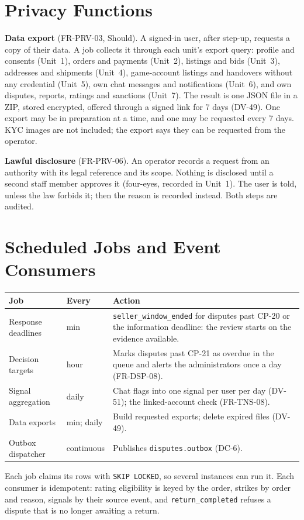\documentclass[11pt,a4paper]{article}
\newenvironment{dtable}[1]{\small\begin{longtable}{#1}}{\end{longtable}}
\begin{document}
\section{Privacy Functions}
\label{sec:privacy}
\textbf{Data export} (FR-PRV-03, Should). A signed-in user, after step-up, requests a copy of their data. A job collects it through each unit's export query: profile and consents (Unit~1), orders and payments (Unit~2), listings and bids (Unit~3), addresses and shipments (Unit~4), game-account listings and handovers without any credential (Unit~5), own chat messages and notifications (Unit~6), and own disputes, reports, ratings and sanctions (Unit~7). The result is one JSON file in a ZIP, stored encrypted, offered through a signed link for 7 days (DV-49). One export may be in preparation at a time, and one may be requested every 7 days. KYC images are not included; the export says they can be requested from the operator.

\textbf{Lawful disclosure} (FR-PRV-06). An operator records a request from an authority with its legal reference and its scope. Nothing is disclosed until a second staff member approves it (four-eyes, recorded in Unit~1). The user is told, unless the law forbids it; then the reason is recorded instead. Both steps are audited.
\section{Scheduled Jobs and Event Consumers}
\label{sec:jobs}
\begin{dtable}{@{}>{\raggedright\arraybackslash}p{3.8cm}>{\raggedright\arraybackslash}p{1.8cm}>{\raggedright\arraybackslash}p{9.6cm}@{}}
\toprule
\textbf{Job} & \textbf{Every} & \textbf{Action} \\ \midrule \endhead
Response deadlines & 5 min & \texttt{seller\_window\_ended} for disputes past CP-20 or the information deadline: the review starts on the evidence available. \\
Decision targets & 1 hour & Marks disputes past CP-21 as overdue in the queue and alerts the administrators once a day (FR-DSP-08). \\
Signal aggregation & daily & Chat flags into one signal per user per day (DV-51); the linked-account check (FR-TNS-08). \\
Data exports & 5 min; daily & Build requested exports; delete expired files (DV-49). \\
Outbox dispatcher & continuous & Publishes \texttt{disputes.outbox} (DC-6). \\
\bottomrule
\end{dtable}
Each job claims its rows with \texttt{SKIP LOCKED}, so several instances can run it. Each consumer is idempotent: rating eligibility is keyed by the order, strikes by order and reason, signals by their source event, and \texttt{return\_completed} refuses a dispute that is no longer awaiting a return.
\end{document}
